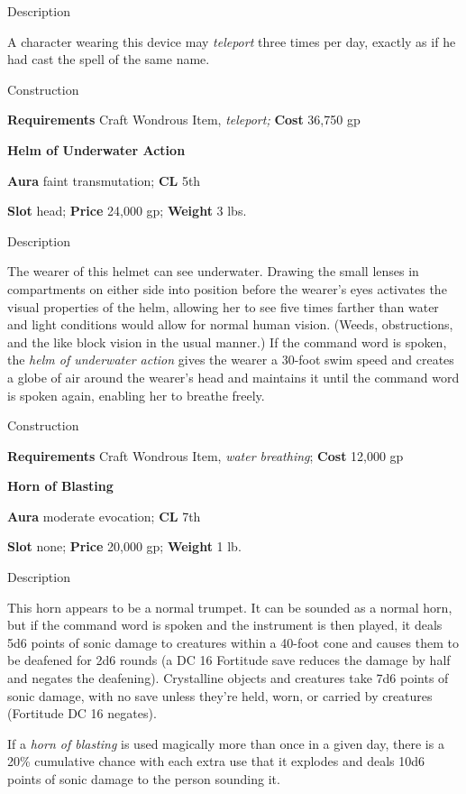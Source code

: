 Description
				
A character wearing this device may \textit{teleport} three times per day, exactly as if he had cast the spell of the same name. 
				
Construction
				
\textbf{Requirements} Craft Wondrous Item,\textit{ teleport;}\textbf{ Cost }36,750 gp
				
\textbf{Helm of Underwater Action}
				
\textbf{Aura} faint transmutation; \textbf{CL} 5th
				
\textbf{Slot }head; \textbf{Price} 24,000 gp; \textbf{Weight }3 lbs.
				
Description
				
The wearer of this helmet can see underwater. Drawing the small lenses in compartments on either side into position before the wearer's eyes activates the visual properties of the helm, allowing her to see five times farther than water and light conditions would allow for normal human vision. (Weeds, obstructions, and the like block vision in the usual manner.) If the command word is spoken, the \textit{helm of underwater action }gives the wearer a 30-foot swim speed and creates a globe of air around the wearer's head and maintains it until the command word is spoken again, enabling her to breathe freely.
				
Construction
				
\textbf{Requirements }Craft Wondrous Item, \textit{water breathing}; \textbf{Cost} 12,000 gp
				
\textbf{Horn of Blasting}
				
\textbf{Aura} moderate evocation;\textbf{ CL }7th
				
\textbf{Slot} none; \textbf{Price} 20,000 gp; \textbf{Weight} 1 lb.
				
Description
				
This horn appears to be a normal trumpet. It can be sounded as a normal horn, but if the command word is spoken and the instrument is then played, it deals 5d6 points of sonic damage to creatures within a 40-foot cone and causes them to be deafened for 2d6 rounds (a DC 16 Fortitude save reduces the damage by half and negates the deafening). Crystalline objects and creatures take 7d6 points of sonic damage, with no save unless they're held, worn, or carried by creatures (Fortitude DC 16 negates).
				
If a \textit{horn of blasting} is used magically more than once in a given day, there is a 20\% cumulative chance with each extra use that it explodes and deals 10d6 points of sonic damage to the person sounding it. 
				
